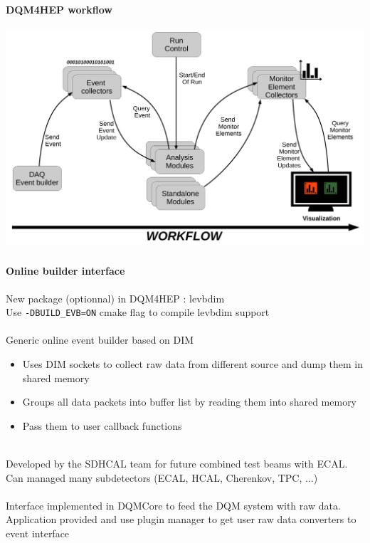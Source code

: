 \documentclass[8pt]{beamer}
\begin{document}
  \begin{frame}
    \frametitle{\secname}
    \framesubtitle{DQM4HEP workflow}
    \begin{center}
      \includegraphics[width=\textwidth]{figs/DQM4HEP_workflow.pdf}
    \end{center}
  \end{frame}
  
  
  
    \begin{frame}[containsverbatim]
    \frametitle{\secname}
    \framesubtitle{Online builder interface}
  
      New package (optionnal) in DQM4HEP : levbdim \\
      Use \verb|-DBUILD_EVB=ON| cmake flag to compile levbdim support \\
      ~ \\
      Generic online event builder based on DIM 
      \begin{itemize}
        \item Uses DIM sockets to collect raw data from different source and dump them in shared memory
        \item Groups all data packets into buffer list by reading them into shared memory
        \item Pass them to user callback functions
      \end{itemize}
      ~ \\      
      Developed by the SDHCAL team for future combined test beams with ECAL. \\
      Can managed many subdetectors (ECAL, HCAL, Cherenkov, TPC, ...) \\
      ~ \\
      Interface implemented in DQMCore to feed the DQM system with raw data. \\
      Application provided and use plugin manager to get user raw data converters to event interface
    
  \end{frame}
  
\end{document}
